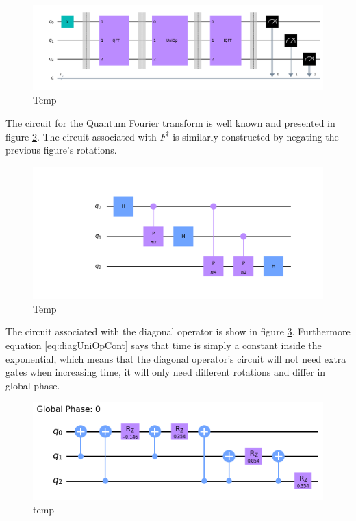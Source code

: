 \documentclass[../../dissertation.tex]{subfiles}
\begin{document}
\begin{figure}[!h]
	\centering
	\includegraphics[scale=0.25]{img/Qiskit/ContQuantumWalk/Circuits/circContQW_N3_S1.png}
	\caption{Temp} 
	\label{fig:contQWCircuitQistkit}
\end{figure}
The circuit for the Quantum Fourier transform is well known and presented in figure \ref{fig:qftCircuitQiskit}. The circuit associated with $F^{\dagger}$ is similarly constructed by negating the previous figure's rotations.\par
\begin{figure}[!h]
	\centering
	\includegraphics[scale=0.28]{img/Qiskit/ContQuantumWalk/Circuits/circQft_N3_S1.png}
	\caption{Temp} 
	\label{fig:qftCircuitQiskit}
\end{figure}
The circuit associated with the diagonal operator is show in figure \ref{fig:diagCircuitQiskit}. Furthermore equation \ref{eq:diagUniOpCont} says that time is simply a constant inside the exponential, which means that the diagonal operator's circuit will not need extra gates when increasing time, it will only need different rotations and differ in global phase. 
\begin{figure}[!h]
	\centering
	\includegraphics[scale=0.50]{img/Qiskit/ContQuantumWalk/Circuits/circDiag_N3_S1.png}
	\caption{temp}
	\label{fig:diagCircuitQiskit}
\end{figure}
\end{document}
